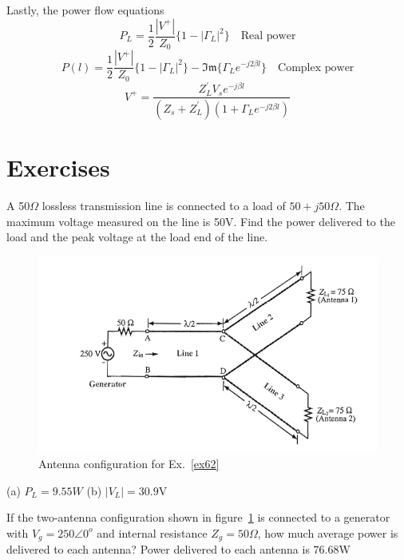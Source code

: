 Lastly, the power flow equations
\begin{dmath*}
P_L = \frac{1}{2}\frac{|V^+|}{Z_0}\lbrace 1 - |\Gamma_L|^2\rbrace\quad\text{Real power}
\end{dmath*}
\begin{dmath*}
P(l) = \frac{1}{2}\frac{|V^+|}{Z_0}\lbrace 1 - |\Gamma_L|^2\rbrace - \mathfrak{Im}\lbrace \Gamma_L e^{- j2\beta l}\rbrace\quad\text{Complex power}
\end{dmath*}
\[
V^+ = \frac{Z_L^{'}V_s e^{-j\beta l}}{(Z_s + Z_L^{'})(1 + \Gamma_L e^{-j2\beta l})}
\]

\section*{Exercises}
\begin{ExerciseList}
\Exercise[label={ex61}]
A 50$\Omega$ lossless transmission line is connected to a load of $50 + j50\Omega$. The maximum voltage measured on the line is 50V. Find the power delivered to the load and the peak voltage at the load end of the line.
\begin{figure}[h]
\centering
\includegraphics[width=1\linewidth]{./graphics/antenna_power_problem}
\caption{Antenna configuration for Ex.~\autoref{ex62}}
\label{fig:antennapowerproblem}
\end{figure}
\Answer[ref={ex61}]
(a) $P_L = 9.55W$ (b) $|V_L| = 30.9$V

\Exercise[label={ex62}]
If the two-antenna configuration shown in figure~\ref{fig:antennapowerproblem} is connected to a generator with $V_g = 250\angle0^o$ and internal resistance $Z_g = 50\varOmega$, how much average power is delivered to each antenna?
\Answer[ref={ex62}]
Power delivered to each antenna is 76.68W
\end{ExerciseList}